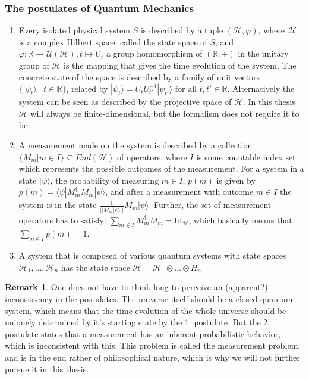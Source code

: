 \documentclass[12pt,a4paper,BCOR15mm,twoside,DIV12]{article}
\def\R{\mathbb{R}}
\def\U{\mathcal{U}}
\def\fa{\text{ for all }}
\def\Id{\text{Id}}
\def\H{\mathcal{H}}
\theoremstyle{definition}
\newtheorem{rem}[Satz]{Remark}
\begin{document}
\subsubsection*{The postulates of Quantum Mechanics}
\begin{enumerate}
\item Every isolated physical system $S$ is described by a tuple $(\H, \varphi)$, where $\H$ is a complex Hilbert space, called the state space of $S$, and $\varphi: \R \rightarrow \U(\H), t \mapsto U_t$ a group homomorphism of $(\R, +)$ in the unitary group of $\H$ is the mapping that gives the time evolution of the system. The concrete state of the space is described by a family of unit vectors $\{ | \psi_t \rangle \mid t \in \R \}$, related by $| \psi_t \rangle = U_t U_{t'}^{-1} | \psi_{t'} \rangle \fa t,t' \in \R$. Alternatively the system can be seen as described by the projective space of $\H$. In this thesis $\H$ will always be finite-dimensional, but the formalism does not require it to be.
\item A measurement made on the system is described by a collection $\{ M_m | m \in I \} \subseteq End(\H)$ of operators, where $I$ is some countable index set which represents the possible outcomes of the measurement. For a system in a state $| \psi \rangle$, the probability of measuring $m \in I$, $p(m)$ is given by $p(m) = \langle \psi | M_m^\dagger M_m | \psi \rangle$, and after a measurement with outcome $m \in I$ the system is in the state $\frac{1}{|| M_m | \psi \rangle ||} M_m | \psi \rangle$. Further, the set of measurement operators has to satisfy: $\sum_{m \in I} M_m^\dagger M_m = \Id_\H$, which basically means that $\sum_{m \in I} p(m) = 1$.
\item A system that is composed of various quantum systems with state spaces $\H_1, \ldots, \H_n$ has the state space $\H = \H_1 \otimes \ldots \otimes H_n$
\end{enumerate}

\begin{rem}
One does not have to think long to perceive an (apparent?) inconsistency in the postulates. The universe itself should be a closed quantum system, which means that the time evolution of the whole universe should be uniquely determined by it's starting state by the 1. postulate. But the 2. postulate states that a measurement has an inherent probabilistic behavior, which is inconsistent with this. This problem is called the measurement problem, and is in the end rather of philosophical nature, which is why we will not further pursue it in this thesis.
\end{rem}
\end{document}
